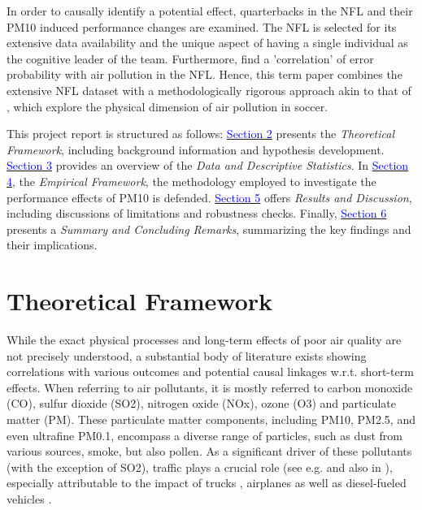 \documentclass[12pt,a4paper]{article}
\newcommand{\mylink}[2]{\hyperref[#1]{\textcolor{blue}{#2}}}
\begin{document}
In order to causally identify a potential effect, quarterbacks in the NFL and their PM10 induced performance changes are examined. The NFL is selected for its extensive data availability and the unique aspect of having a single individual as the cognitive leader of the team. Furthermore, \citet{heintz2022} find a 'correlation' of error probability with air pollution in the NFL. Hence, this term paper combines the extensive NFL dataset with a methodologically rigorous approach akin to that of \citet{lichter2017}, which explore the physical dimension of air pollution in soccer.

This project report is structured as follows: \mylink{2}{Section 2} presents the \textit{Theoretical Framework}, including background information and hypothesis development. \mylink{3}{Section 3} provides an overview of the \textit{Data and Descriptive Statistics}. In \mylink{4}{Section 4}, the \textit{Empirical Framework}, the methodology employed to investigate the performance effects of PM10 is defended. \mylink{5}{Section 5} offers \textit{Results and Discussion}, including discussions of limitations and robustness checks. Finally, \mylink{6}{Section 6} presents a \textit{Summary and Concluding Remarks}, summarizing the key findings and their implications. 

 
\clearpage
\section{Theoretical Framework}
\label{2}
While the exact physical processes and long-term effects of poor air quality are not precisely understood, a substantial body of literature exists showing correlations with various outcomes and potential causal linkages w.r.t. short-term effects. When referring to air pollutants, it is mostly referred to carbon monoxide (CO), sulfur dioxide (SO2), nitrogen oxide (NOx), ozone (O3) and particulate matter (PM). These particulate matter components, including PM10, PM2.5, and even ultrafine PM0.1, encompass a diverse range of particles, such as dust from various sources, smoke, but also pollen. As a significant driver of these pollutants (with the exception of SO2), traffic plays a crucial role (see e.g. \citealp{thorpe2008,costa2017,zhong2017} and also in \citealp{bauernschuster2017}), especially attributable to the impact of trucks \citep{lena2002}, airplanes \citep{schlenker2016} as well as diesel-fueled vehicles \citep{kinney2000}.
\end{document}
